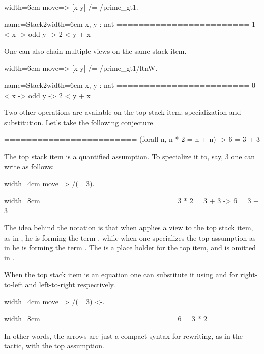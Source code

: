 \begin{coq}{}{width=6cm}
move=> [x y] /= /prime_gt1.
\end{coq}
\begin{coqout}{name=Stack2}{width=6cm}
 x, y : nat
 ========================
 1 < x -> odd y -> 2 < y + x
\end{coqout}

One can also chain multiple views on the same stack item.

\begin{coq}{}{width=6cm}
move=> [x y] /= /prime_gt1/ltnW.
\end{coq}
\begin{coqout}{name=Stack2}{width=6cm}
 x, y : nat
 ========================
 0 < x -> odd y -> 2 < y + x
\end{coqout}

Two other operations are available on the top stack item: specialization
and substitution.  Let's take the following conjecture.

\begin{coqout}{}{}
========================
(forall n, n * 2 = n + n) -> 6 = 3 + 3
\end{coqout}

The top stack item is a quantified assumption.  To specialize it to, say,
3 one can write as follows:

\begin{coq}{}{width=4cm}
move=> /(_ 3).
\end{coq}
\begin{coqout}{}{width=8cm}
========================
3 * 2 = 3 + 3 -> 6 = 3 + 3
\end{coqout}
The idea behind the notation is that when applies a view to the top
stack item, as in , he is forming the term , while
when one specializes the top assumption as in  he is forming the
term .  The \C{_} is a place holder for the top item, and is
omitted in .

When the top stack item is an equation one can substitute it using \C{<-}
and \C{->} for right-to-left and left-to-right respectively.

\begin{coq}{}{width=4cm}
move=> /(_ 3) <-.
\end{coq}
\begin{coqout}{}{width=8cm}
========================
6 = 3 * 2
\end{coqout}
In other words, the arrows are just a compact syntax for rewriting,
as in the  tactic, with the top assumption.

